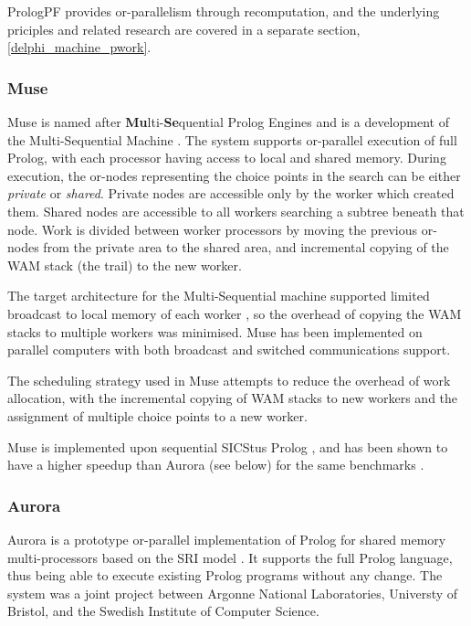 PrologPF provides or-parallelism through recomputation, and the underlying
priciples and related research are covered in a separate section,
\ref{delphi_machine_pwork}.

\subsubsection{Muse}

Muse \cite{AKM91}
is named after \textbf{Mu}lti-\textbf{Se}quential Prolog Engines and is
a development of the Multi-Sequential Machine \cite{Ali87}.
The system supports or-parallel execution of full Prolog, with each processor having
access to local and shared memory. 
During execution, the or-nodes representing the choice points in the
search can be either \textit{private} or \textit{shared}.
Private nodes are accessible only by the worker which created them.
Shared nodes are accessible to all workers searching a subtree beneath that
node. Work is divided between worker processors by
moving the previous or-nodes from the private area to the shared area, and
incremental copying of the WAM stack (the trail) to the new worker.

The target architecture for the Multi-Sequential machine supported limited
broadcast to local memory of each worker \cite{Ali88},
so the overhead of copying the WAM
stacks to multiple workers was minimised.  Muse has been implemented on
parallel computers with both broadcast and switched communications support.

The scheduling strategy used in Muse attempts to reduce the overhead of
work allocation, with the incremental copying of WAM stacks to new workers
and the assignment of multiple choice points to a new worker.

Muse is implemented upon sequential SICStus Prolog \cite{BBP+94}, and has been shown to
have a higher speedup than Aurora (see below) for the same benchmarks
\cite{AKM91}.

\subsubsection{Aurora}


Aurora \cite{LWH+90} is a prototype or-parallel implementation of Prolog for
shared memory multi-processors based on the SRI model \cite{War87}.
It supports the full Prolog language,
thus being able to execute existing Prolog programs without any change.
The system was a joint project between Argonne National Laboratories,
Universty of Bristol, and the Swedish Institute of Computer Science.

